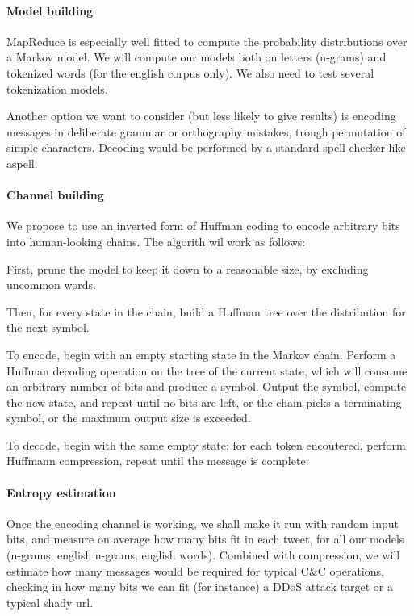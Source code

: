 \documentclass[a4paper,11pt]{article}
\begin{document}
\paragraph{Model building}

MapReduce is especially well fitted to compute the probability distributions over a Markov model. We will compute our models both on letters (n-grams) and tokenized words (for the english corpus only). We also need to test several tokenization models.

Another option we want to consider (but less likely to give results) is encoding messages in deliberate grammar or orthography mistakes, trough permutation of simple characters. Decoding would be performed by a standard spell checker like aspell.

\paragraph{Channel building}

We propose to use an inverted form of Huffman coding to encode arbitrary bits into human-looking chains. The algorith wil work as follows:

First, prune the model to keep it down to a reasonable size, by excluding uncommon words.

Then, for every state in the chain, build a Huffman tree over the distribution for the next symbol.

To encode, begin with an empty starting state in the Markov chain. Perform a Huffman decoding operation on the tree of the current state, which will consume an arbitrary number of bits and produce a symbol. Output the symbol, compute the new state, and repeat until no bits are left, or the chain picks a terminating symbol, or the maximum output size is exceeded.

To decode, begin with the same empty state; for each token encoutered, perform Huffmann compression, repeat until the message is complete.

\paragraph{Entropy estimation}

Once the encoding channel is working, we shall make it run with random input bits, and measure on average how many bits fit in each tweet, for all our models (n-grams, english n-grams, english words). Combined with compression, we will estimate how many messages would be required for typical C\&C operations, checking in how many bits we can fit (for instance) a DDoS attack target or a typical shady url.
\end{document}
